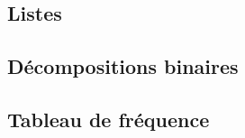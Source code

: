 

\usepackage{parcolumns}
\setlength{\parindent}{0pt}

 

\subsection{Listes}


\subsection{Décompositions binaires}


\subsection{Tableau de fréquence}


